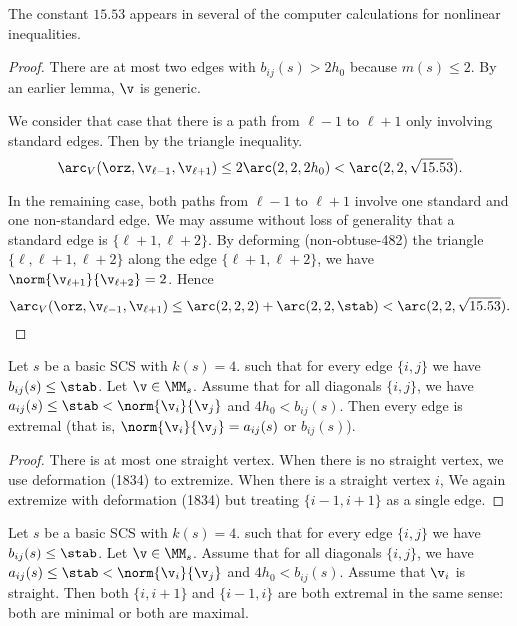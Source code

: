 \begin{remark} The constant $15.53$ appears in several of the computer calculations for
nonlinear inequalities.
\end{remark}

\begin{proof}  
There are at most two edges with $b_{ij}(s)>2h_0$ because $m(s)\le 2$.  
By an earlier lemma, $\v$ is generic.

We consider that case that there is a path from $\ell-1$ to $\ell+1$ only involving standard edges.
Then by the triangle inequality.
\[
\arc_V(\orz,{\v_{\ell-1}},{\v_{\ell+1}}) \le 2\arc(2,2,2h_0)<\arc(2,2,\sqrt{15.53}).
\]

In the remaining case, both paths from $\ell-1$ to $\ell+1$ involve one standard and one non-standard edge.
We may assume without loss of generality that a standard edge is $\{\ell+1,\ell+2\}$.
By deforming (non-obtuse-482) the triangle $\{\ell,\ell+1,\ell+2\}$ along the edge $\{\ell+1,\ell+2\}$, we have
$\norm{\v_{\ell+1}}{\v_{\ell+2}} = 2$.
Hence 
\[
\arc_V(\orz,{\v_{\ell-1}},{\v_{\ell+1}}) \le \arc(2,2,2) + \arc(2,2,\stab) <\arc(2,2,\sqrt{15.53}).
\]
\end{proof}

\begin{lemma}[]
Let $s$ be a basic SCS with $k(s)=4$.
such that for every edge $\{i,j\}$ we have $b_{ij}(s)\le\stab$.
Let $\v\in \MM_s$.  
Assume that
for all diagonals $\{i,j\}$, we have
$a_{ij}(s)\le \stab < \norm{\v_i}{\v_j}$ and $4h_0 < b_{ij}(s)$.
Then every edge is extremal (that is, $\norm{\v_i}{\v_j} = a_{ij}(s)$ or $b_{ij}(s)$).
\end{lemma}


\begin{proof}
There is at most one straight vertex.
When there is no straight vertex, we use deformation (1834)  to extremize.  When there is a straight vertex $i$,
We again extremize with deformation (1834) but treating $\{i-1,i+1\}$ as a single edge.
\end{proof}

\begin{lemma}[]
Let $s$ be a basic SCS with $k(s)=4$.
such that for every edge $\{i,j\}$ we have $b_{ij}(s)\le\stab$.
Let $\v\in \MM_s$.  
Assume that
for all diagonals $\{i,j\}$, we have
$a_{ij}(s)\le \stab < \norm{\v_i}{\v_j}$ and $4h_0 < b_{ij}(s)$.
Assume that $\v_i$ is straight.
Then both $\{i,i+1\}$ and $\{i-1,i\}$ are both extremal in the same sense: both are minimal
or both are maximal.
\end{lemma}


